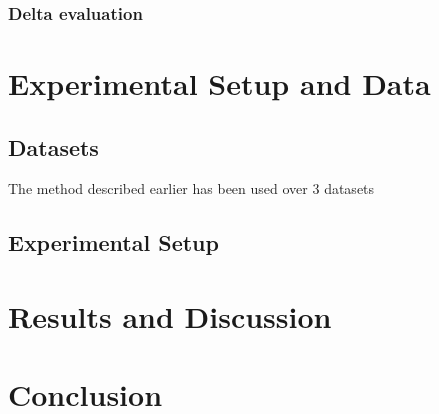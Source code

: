 \documentclass[twocolumn, switch]{article} %
\begin{document}
\subsubsection{Delta evaluation}
\lipsum[7]

\section{Experimental Setup and Data}
\lipsum[8]

\subsection{Datasets}
The method described earlier has been used over 3 datasets 

\subsection{Experimental Setup}
\lipsum[10]

\section{Results and Discussion}
\lipsum[11]

\section{Conclusion}
\lipsum[12] \cite{Cerrone}



\normalsize



\end{document}
